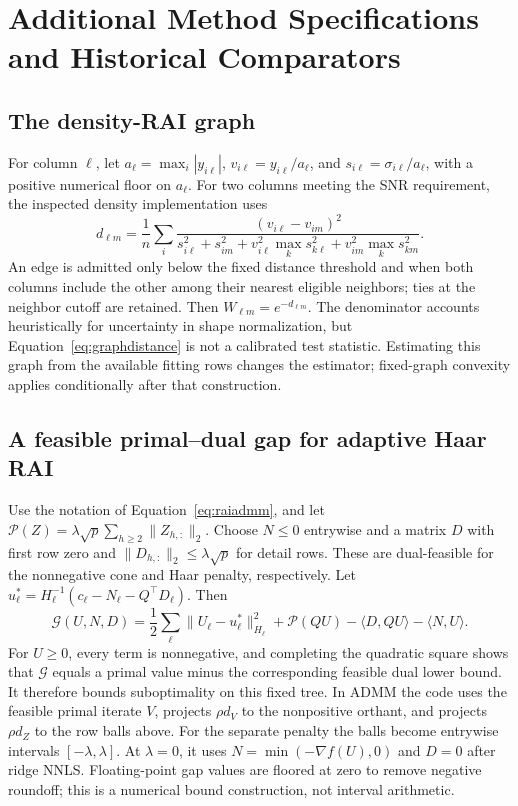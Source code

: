 \section{Additional Method Specifications and Historical Comparators}\label{app:extensions}
\subsection{The density-RAI graph}\label{app:graphdetails}
For column $\ell$, let $a_\ell=\max_i|y_{i\ell}|$, $v_{i\ell}=y_{i\ell}/a_\ell$, and $s_{i\ell}=\sigma_{i\ell}/a_\ell$, with a positive numerical floor on $a_\ell$. For two columns meeting the SNR requirement, the inspected density implementation uses
\begin{equation}\label{eq:graphdistance}
 d_{\ell m}=\frac1n\sum_i
 \frac{(v_{i\ell}-v_{im})^2}
 {s_{i\ell}^2+s_{im}^2+v_{i\ell}^2\max_k s_{k\ell}^2+v_{im}^2\max_k s_{km}^2}.
\end{equation}
An edge is admitted only below the fixed distance threshold and when both columns include the other among their nearest eligible neighbors; ties at the neighbor cutoff are retained. Then $W_{\ell m}=e^{-d_{\ell m}}$. The denominator accounts heuristically for uncertainty in shape normalization, but Equation~\eqref{eq:graphdistance} is not a calibrated test statistic. Estimating this graph from the available fitting rows changes the estimator; fixed-graph convexity applies conditionally after that construction.

\subsection{A feasible primal--dual gap for adaptive Haar RAI}\label{app:haargap}
Use the notation of Equation~\eqref{eq:raiadmm}, and let $\mathcal P(Z)=\lambda\sqrt p\sum_{h\geq2}\|Z_{h,:}\|_2$. Choose $N\leq0$ entrywise and a matrix $D$ with first row zero and $\|D_{h,:}\|_2\leq\lambda\sqrt p$ for detail rows. These are dual-feasible for the nonnegative cone and Haar penalty, respectively.
Let $u_\ell^*=H_\ell^{-1}(c_\ell-N_\ell-Q^\top D_\ell)$. Then
\begin{equation}\label{eq:haargap}
 \mathcal G(U,N,D)=\frac12\sum_\ell\|U_\ell-u_\ell^*\|_{H_\ell}^2
 +\mathcal P(QU)-\langle D,QU\rangle-\langle N,U\rangle.
\end{equation}
For $U\geq0$, every term is nonnegative, and completing the quadratic square shows that $\mathcal G$ equals a primal value minus the corresponding feasible dual lower bound. It therefore bounds suboptimality on this fixed tree. In ADMM the code uses the feasible primal iterate $V$, projects $\rho d_V$ to the nonpositive orthant, and projects $\rho d_Z$ to the row balls above. For the separate penalty the balls become entrywise intervals $[-\lambda,\lambda]$. At $\lambda=0$, it uses $N=\min(-\nabla f(U),0)$ and $D=0$ after ridge NNLS. Floating-point gap values are floored at zero to remove negative roundoff; this is a numerical bound construction, not interval arithmetic.

